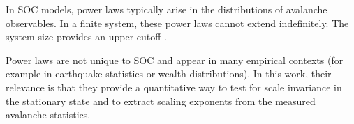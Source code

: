 In SOC models, power laws typically arise in the distributions of avalanche observables. In a finite system, these power laws cannot extend indefinitely. The system size provides an upper cutoff \cite{christensen1991dynamical}.

Power laws are not unique to SOC and appear in many empirical contexts (for example in earthquake statistics or wealth distributions). In this work, their relevance is that they provide a quantitative way to test for scale invariance in the stationary state and to extract scaling exponents from the measured avalanche statistics.
